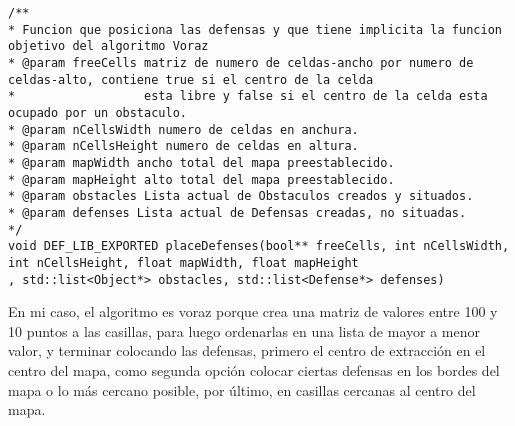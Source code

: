 \begin{lstlisting}
/**
* Funcion que posiciona las defensas y que tiene implicita la funcion objetivo del algoritmo Voraz
* @param freeCells matriz de numero de celdas-ancho por numero de celdas-alto, contiene true si el centro de la celda
*                  esta libre y false si el centro de la celda esta ocupado por un obstaculo.
* @param nCellsWidth numero de celdas en anchura.
* @param nCellsHeight numero de celdas en altura.
* @param mapWidth ancho total del mapa preestablecido.
* @param mapHeight alto total del mapa preestablecido.
* @param obstacles Lista actual de Obstaculos creados y situados.
* @param defenses Lista actual de Defensas creadas, no situadas.
*/
void DEF_LIB_EXPORTED placeDefenses(bool** freeCells, int nCellsWidth, int nCellsHeight, float mapWidth, float mapHeight
, std::list<Object*> obstacles, std::list<Defense*> defenses)
\end{lstlisting}

En mi caso, el algoritmo es voraz porque crea una matriz de valores entre 100 y 10 puntos a las casillas, para luego ordenarlas en una lista de mayor a menor valor, y terminar colocando las defensas, primero el centro de extracción en el centro del mapa, como segunda opción colocar ciertas defensas en los bordes del mapa o lo más cercano posible, por último, en casillas cercanas al centro del mapa.